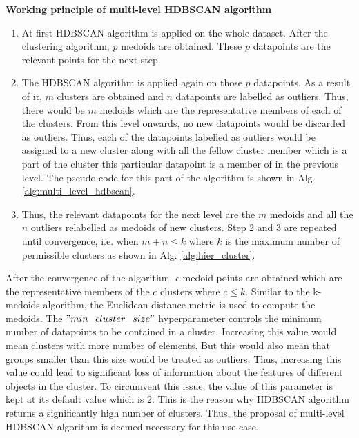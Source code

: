 \vspace{5mm}

\textbf{Working principle of multi-level \ac{HDBSCAN} algorithm}
\begin{enumerate}
    \item At first \ac{HDBSCAN} algorithm is applied on the whole dataset. After the clustering algorithm, $p$ medoids are obtained. These $p$ datapoints are the relevant points for the next step.
    \item The \ac{HDBSCAN} algorithm is applied again on those $p$ datapoints. As a result of it, $m$ clusters are obtained and $n$ datapoints are labelled as outliers. Thus, there would be $m$ medoids which are the representative members of each of the clusters. From this level onwards, no new datapoints would be discarded as outliers. Thus, each of the datapoints labelled as outliers would be assigned to a new cluster along with all the fellow cluster member which is a part of the cluster this particular datapoint is a member of in the previous level. The pseudo-code for this part of the algorithm is shown in Alg. \ref{alg:multi_level_hdbscan}. 
    \item Thus, the relevant datapoints for the next level are the $m$ medoids and all the $n$ outliers relabelled as medoids of new clusters. Step 2 and 3 are repeated until convergence, i.e. when $m + n \leq k$ where $k$ is the maximum number of permissible clusters as shown in Alg. \ref{alg:hier_cluster}.
\end{enumerate}
After the convergence of the algorithm, $c$ medoid points are obtained which are the representative members of the $c$ clusters where $c \leq k$. Similar to the k-medoids algorithm, the Euclidean distance metric is used to compute the medoids. The $"min\_cluster\_size"$ hyperparameter controls the minimum number of datapoints to be contained in a cluster. Increasing this value would mean clusters with more number of elements. But this would also mean that groups smaller than this size would be treated as outliers. Thus, increasing this value could lead to significant loss of information about the features of different objects in the cluster. To circumvent this issue, the value of this parameter is kept at its default value which is 2. This is the reason why \ac{HDBSCAN} algorithm returns a significantly high number of clusters. Thus, the proposal of multi-level \ac{HDBSCAN} algorithm is deemed necessary for this use case.

